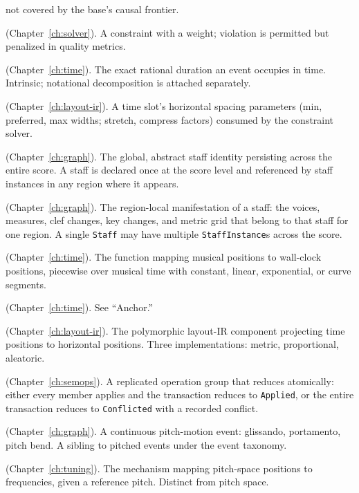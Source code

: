 \documentclass[11pt,letterpaper]{report}
\begin{document}
\begin{description}
    not covered by the base's causal frontier.
  \item[Soft constraint] (Chapter~\ref{ch:solver}). A constraint
    with a weight; violation is permitted but penalized in
    quality metrics.
  \item[Sounding duration] (Chapter~\ref{ch:time}). The exact
    rational duration an event occupies in time. Intrinsic;
    notational decomposition is attached separately.
  \item[Spring slot] (Chapter~\ref{ch:layout-ir}). A time slot's
    horizontal spacing parameters (min, preferred, max widths;
    stretch, compress factors) consumed by the constraint solver.
  \item[Staff] (Chapter~\ref{ch:graph}). The global, abstract
    staff identity persisting across the entire score. A staff is
    declared once at the score level and referenced by staff
    instances in any region where it appears.
  \item[Staff instance] (Chapter~\ref{ch:graph}). The
    region-local manifestation of a staff: the voices, measures,
    clef changes, key changes, and metric grid that belong to
    that staff for one region. A single \texttt{Staff} may have
    multiple \texttt{StaffInstance}s across the score.
  \item[Tempo map] (Chapter~\ref{ch:time}). The function mapping
    musical positions to wall-clock positions, piecewise over
    musical time with constant, linear, exponential, or curve
    segments.
  \item[Time anchor] (Chapter~\ref{ch:time}). See ``Anchor.''
  \item[Time axis] (Chapter~\ref{ch:layout-ir}). The polymorphic
    layout-IR component projecting time positions to horizontal
    positions. Three implementations: metric, proportional,
    aleatoric.
  \item[Transaction] (Chapter~\ref{ch:semops}). A replicated
    operation group that reduces atomically: either every member
    applies and the transaction reduces to \texttt{Applied}, or
    the entire transaction reduces to \texttt{Conflicted} with a
    recorded conflict.
  \item[Trajectory] (Chapter~\ref{ch:graph}). A continuous
    pitch-motion event: glissando, portamento, pitch bend. A
    sibling to pitched events under the event taxonomy.
  \item[Tuning system] (Chapter~\ref{ch:tuning}). The mechanism
    mapping pitch-space positions to frequencies, given a
    reference pitch. Distinct from pitch space.

\end{description}
\end{document}
